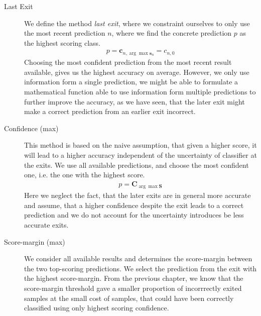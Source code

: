 \begin{description}
	\item[Last Exit] We define the method \emph{last exit}, where we constraint ourselves to only use the most recent prediction $n$, where we find the concrete prediction $p$ as the highest scoring class. 
	\begin{align*}
		p = \mathbf{c}_{n, \arg \max  \mathbf{s}_n} = c_{n,0}
	\end{align*}
	 Choosing the most confident prediction from the most recent result available, gives us the highest accuracy on average. However, we only use information form a single prediction, we might be able to formulate a mathematical function able to use information form multiple predictions to further improve the accuracy, as we have seen, that the later exit might make a correct prediction from an earlier exit incorrect. 
	 
	\item[Confidence (max)] This method is based on the naive assumption, that given a higher score, it will lead to a higher accuracy independent of the uncertainty of classifier at the exits. We use all available predictions, and choose the most confident one, i.e. the one with the highest score.
	\begin{align*}
	p = \mathbf{C}_{\arg \max  \mathbf{S}}
	\end{align*}
	Here we neglect the fact, that the later exits are in general more accurate and assume, that a higher confidence despite the exit leads to a correct prediction and we do not account for the uncertainty introduces be less accurate exits.
	\item[Score-margin (max)] We consider all available results and determines the score-margin between the two top-scoring predictions. We select the prediction from the exit with the highest score-margin. From the previous chapter, we know that the score-margin threshold gave a smaller proportion of incorrrectly exited samples at the small cost of samples, that could have been correctly classified using only highest scoring confidence.
	

\end{description}
